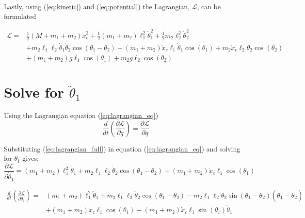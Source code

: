 \documentclass[10pt]{article}
\begin{document}
    Lastly, using (\ref{eq:kinetic}) and (\ref{eq:potential}) the 
    Lagrangian, $\mathcal{L}$, can be formulated
    
    \begin{equation} \label{eq:lagrangian_full}
        \begin{aligned}
            \mathcal{L} = &\frac{1}{2}  (M + m_1 + m_2)  \dot x_c^2 + \frac{1}{2}(m_1 + m_2)\ell_1^2\dot\theta_1^2+ \frac{1}{2}m_2\ell_2^2\dot\theta_2^2\\
            &+m_2\ell_1\ell_2\dot\theta_1\dot\theta_2\cos(\theta_1 - \theta_2)      +      (m_1 + m_2)\dot x_c\ell_1\dot\theta_1\cos(\theta_1) + m_2\dot x_c\ell_2\dot\theta_2\cos(\theta_2)\\
            & + (m_1 + m_2)g\ell_1\cos(\theta_1) + m_2g\ell_2\cos(\theta_2)
        \end{aligned}
    \end{equation}
    

    \pagebreak
    \section{Solve for $\ddot \theta_1$}

    Using the Lagrangian equation (\ref{eq:lagrangian_eq})
    \begin{equation} \label{eq:lagrangian_eq}
        \frac{d}{dt} \left(\frac{\partial \mathcal{L}}{\partial \dot q} \right) = 
        \frac{\partial \mathcal{L}}{\partial q}
    \end{equation}

    Substituting (\ref{eq:lagrangian_full}) in equation (\ref{eq:lagrangian_eq}) and solving for $\theta_1$ gives:
    \begin{equation} \label{eq: lagrange Step1}
        \frac{\partial \mathcal{L}}{\partial \dot\theta_1} = 
         (m_1 + m_2)\ell_1^2\dot\theta_1 + m_2\ell_1\ell_2\dot\theta_2\cos(\theta_1 - \theta_2) + (m_1+m_2)\dot x_c\ell_1\cos(\theta_1)
    \end{equation}

    \begin{equation} \label{eq: lagrange Step2}
        \begin{aligned}
        \frac{d}{dt} \left(\frac{\partial \mathcal{L}}{\partial \dot\theta_1}\right) =& 
         (m_1 + m_2)\ell_1^2\ddot\theta_1   +   m_2\ell_1\ell_2\ddot\theta_2\cos(\theta_1 - \theta_2)  -m_2\ell_1\ell_2\dot\theta_2\sin(\theta_1-\theta_2)(\dot\theta_1 - \dot\theta_2) \\
           & +   (m_1 +m_2)\ddot x_c\ell_1\cos(\theta_1) -(m_1 + m_2) \dot x_c\ell_1\sin(\theta_1)\dot\theta_1
        \end{aligned}
    \end{equation}
\end{document}

